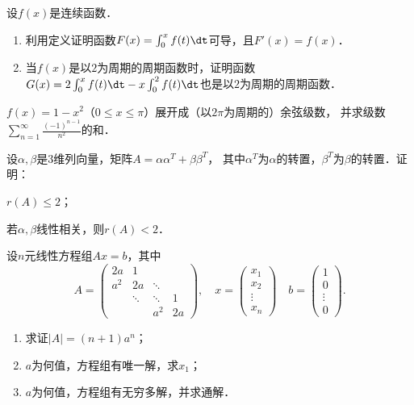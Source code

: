 \documentclass[plain,noanswer,medmath]{../../template/jnuexam}
\begin{document}
\begin{problem}[points=10]
设$f(x)$是连续函数．
\begin{enumerate}
\item 利用定义证明函数$F(x) = \int_0^x f(t)\dt$可导，且$F'(x) = f(x)$．
\item 当$f(x)$是以$2$为周期的周期函数时，证明函数
      $G(x) = 2\int_0^x f(t)\dt - x\int_0^2 f(t)\dt$也是以$2$为周期的周期函数．
\end{enumerate}
\end{problem}


\begin{problem}[points=11]
$f(x) = 1 - x^2$（$0 \le x \le \pi$）展开成（以$2\pi$为周期的）余弦级数，
并求级数$\sum_{n = 1}^{\infty}\frac{(- 1)^{n - 1}}{n^2}$的和．
\end{problem}


\begin{problem}[points=10]
设$\alpha ,\beta$是$3$维列向量，矩阵$A = \alpha \alpha^T + \beta \beta^T$，
其中$\alpha^T$为$\alpha$的转置，$\beta^T$为$\beta$的转置．证明：\par
\begin{enumerate*}
\item $r(A) \le 2$；
\item 若$\alpha ,\beta$线性相关，则$r(A) < 2$．
\end{enumerate*}
\end{problem}


\begin{problem}[points=12]
设$n$元线性方程组$Ax = b$，其中
$$A = \begin{pmatrix}
   2a &      1 &        & \\
  a^2 &     2a & \ddots & \\
      & \ddots & \ddots & 1 \\
      &        &    a^2 & 2a
\end{pmatrix},\quad x = \begin{pmatrix}
  x_1 \\
  x_2 \\
  \vdots \\
  x_n
\end{pmatrix}\quad b = \begin{pmatrix}
  1 \\
  0 \\
  \vdots \\
  0
\end{pmatrix}.$$
\begin{enumerate}
\item 求证$|A| = \left(n + 1 \right) a^n$；
\item $a$为何值，方程组有唯一解，求$x_1$；
\item $a$为何值，方程组有无穷多解，并求通解．
\end{enumerate}
\end{problem}
\end{document}

